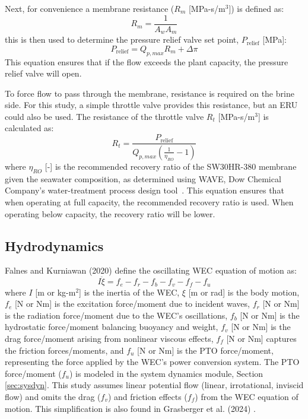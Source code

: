 \documentclass[a4paper,12pt]{elsarticle}
\begin{document}
Next, for convenience a membrane resistance ($R_m$ [MPa-s/m$^3$]) is defined as: 
\begin{equation}
    R_m = \frac{1}{A_w A_m}
    \label{eq:membrane_resistance}
\end{equation}
\noindent this is then used to determine the pressure relief valve set point, $P_{\text{relief}}$ [MPa]:
\begin{equation}
    P_{\text{relief}} = Q_{p,max}R_m + \Delta \pi
    \label{eq:pressure_relief}
\end{equation}
\noindent This equation ensures that if the flow exceeds the plant capacity, the pressure relief valve will open.

To force flow to pass through the membrane, resistance is required on the brine side. For this study, a simple throttle valve provides this resistance, but an ERU could also be used. The resistance of the throttle valve $R_t$ [MPa-s/m$^3$] is calculated as: 
\begin{equation}
    R_t = \frac{P_{\text{relief}}}{Q_{p,max}(\frac{1}{\eta_{RO}} - 1)}
\end{equation}
\noindent where $\eta_{RO}$ [-] is the recommended recovery ratio of the SW30HR-380 membrane given the seawater composition, as determined using WAVE, Dow Chemical Company's water-treatment process design tool~\cite{wave}. This equation ensures that when operating at full capacity, the recommended recovery ratio is used. When operating below capacity, the recovery ratio will be lower.

\subsection{Hydrodynamics} \label{sec:hydro}
Falnes and Kurniawan (2020) \cite{falnes2020} define the oscillating WEC equation of motion as:
\begin{equation}
    \label{eq:wec}
    I\ddot{\xi} = f_e - f_r - f_b - f_v - f_f - f_u  
\end{equation}
\noindent where $I$ [m or kg-m$^2$] is the inertia of the WEC, $\xi$ [m or rad] is the body motion, $f_e$ [N or Nm] is the excitation force/moment due to incident waves, $f_r$ [N or Nm] is the radiation force/moment due to the WEC’s oscillations, $f_b$ [N or Nm] is the hydrostatic force/moment balancing buoyancy and weight, $f_v$ [N or Nm] is the drag force/moment arising from nonlinear viscous effects, $f_f$ [N or Nm] captures the friction forces/moments, and $f_u$ [N or Nm] is the PTO force/moment, representing the force applied by the WEC's power conversion system. The PTO force/moment ($f_u$) is modeled in the system dynamics module, Section \ref{sec:sysdyn}. This study assumes linear potential flow (linear, irrotational, inviscid flow) and omits the drag ($f_v$) and friction effects ($f_f$) from the WEC equation of motion. This simplification is also found in Grasberger et al. (2024) \cite{Grasberger2024}.
\end{document}
